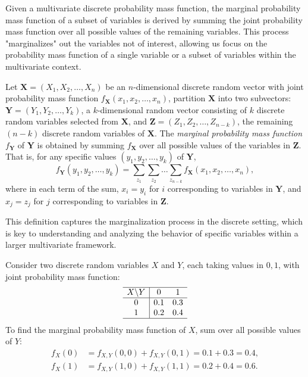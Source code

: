 Given a multivariate discrete probability mass function, the marginal probability mass function of a subset of variables is derived by summing the joint probability mass function over all possible values of the remaining variables. This process "marginalizes" out the variables not of interest, allowing us focus on the probability mass function of a single variable or a subset of variables within the multivariate context.

\begin{definition}
Let $\mathbf{X} = (X_{1}, X_{2}, \ldots, X_{n})$ be an $n$-dimensional discrete random vector with joint probability mass function $f_{\mathbf{X}}(x_{1}, x_{2}, \ldots, x_{n})$, partition $\mathbf{X}$ into two subvectors: $\mathbf{Y} = (Y_{1}, Y_{2}, \ldots, Y_{k})$, a $k$-dimensional random vector consisting of $k$ discrete random variables selected from $\mathbf{X}$, and $\mathbf{Z} = (Z_{1}, Z_{2}, \ldots, Z_{n-k})$, the remaining $(n - k)$ discrete random variables of $\mathbf{X}$. The \emph{marginal probability mass function} $f_{\mathbf{Y}}$ of $\mathbf{Y}$ is obtained by summing $f_{\mathbf{X}}$ over all possible values of the variables in $\mathbf{Z}$. That is, for any specific values $(y_{1}, y_{2}, \ldots, y_{k})$ of $\mathbf{Y}$,
\[
f_{\mathbf{Y}}(y_{1}, y_{2}, \ldots, y_{k}) = \sum_{z_{1}} \sum_{z_{2}} \ldots \sum_{z_{n-k}} f_{\mathbf{X}}(x_{1}, x_{2}, \ldots, x_{n}),
\]
where in each term of the sum, $x_{i} = y_{i}$ for $i$ corresponding to variables in $\mathbf{Y}$, and $x_{j} = z_{j}$ for $j$ corresponding to variables in $\mathbf{Z}$.
\end{definition}

This definition captures the marginalization process in the discrete setting, which is key to understanding and analyzing the behavior of specific variables within a larger multivariate framework.

\begin{example}
Consider two discrete random variables $X$ and $Y$, each taking values in ${0, 1}$, with joint probability mass function:
\[
\begin{array}{c|cc}
\hline
X \backslash Y & 0 & 1 \\
\hline
0 & 0.1 & 0.3 \\
1 & 0.2 & 0.4 \\
\hline
\end{array}
\]
To find the marginal probability mass function of $X$, sum over all possible values of $Y$:
\[
\begin{aligned}
f_{X}(0) &= f_{X,Y}(0,0) + f_{X,Y}(0,1) = 0.1 + 0.3 = 0.4, \\
f_{X}(1) &= f_{X,Y}(1,0) + f_{X,Y}(1,1) = 0.2 + 0.4 = 0.6.
\end{aligned}
\]
\end{example}


